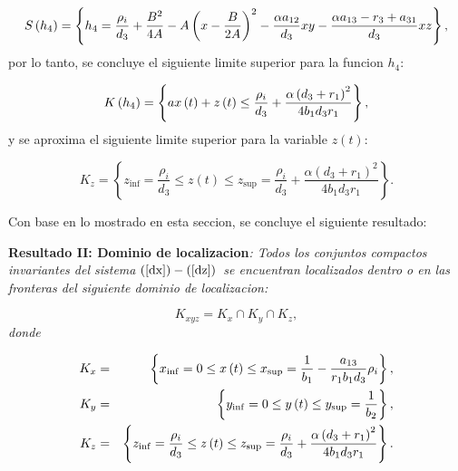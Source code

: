 \documentclass[letterpaper,11pt]{article}
\begin{document}
\begin{equation*}
S\left( h_{4}\right) =\left\{ h_{4}=\frac{\rho _{i}}{d_{3}}+\frac{B^{2}}{4A}%
-A\left( x-\frac{B}{2A}\right) ^{2}-\frac{\alpha a_{12}}{d_{3}}xy-\frac{%
\alpha a_{13}-r_{3}+a_{31}}{d_{3}}xz\right\} ,
\end{equation*}%
por lo tanto, se concluye el siguiente limite superior para la funcion $%
h_{4} $:

\begin{equation*}
K\left( h_{4}\right) =\left\{ ax\left( t\right) +z\left( t\right) \leq \frac{%
\rho _{i}}{d_{3}}+\frac{\alpha \left( d_{3}+r_{1}\right) ^{2}}{%
4b_{1}d_{3}r_{1}}\right\} ,
\end{equation*}%
y se aproxima el siguiente limite superior para la variable $z\left(
t\right) $:

\begin{equation*}
K_{z}=\left\{ z_{\inf }=\frac{\rho _{i}}{d_{3}}\leq z\left( t\right) \leq
z_{\sup }=\frac{\rho _{i}}{d_{3}}+\frac{\alpha \left( d_{3}+r_{1}\right) ^{2}%
}{4b_{1}d_{3}r_{1}}\right\} .
\end{equation*}

Con base en lo mostrado en esta seccion, se concluye el siguiente resultado:

\bigskip

\textbf{Resultado II: Dominio de localizacion}\textit{: Todos los conjuntos
compactos invariantes del sistema }$\left( \ref{dx}\right) -\left( \ref{dz}%
\right) $\textit{\ se encuentran localizados dentro o en las fronteras del
siguiente dominio de localizacion:}

\bigskip 
\begin{equation*}
K_{xyz}=K_{x}\cap K_{y}\cap K_{z},
\end{equation*}%
\textit{donde}

\bigskip 
\begin{eqnarray*}
K_{x} &=&\left\{ x_{\inf }=0\leq x\left( t\right) \leq x_{\sup }=\frac{1}{%
b_{1}}-\frac{a_{13}}{r_{1}b_{1}d_{3}}\rho _{i}\right\} , \\
K_{y} &=&\left\{ y_{\inf }=0\leq y\left( t\right) \leq y_{\sup }=\frac{1}{%
b_{2}}\right\} , \\
K_{z} &=&\left\{ z_{\inf }=\frac{\rho _{i}}{d_{3}}\leq z\left( t\right) \leq
z_{\sup }=\frac{\rho _{i}}{d_{3}}+\frac{\alpha \left( d_{3}+r_{1}\right) ^{2}%
}{4b_{1}d_{3}r_{1}}\right\} .
\end{eqnarray*}

\bigskip

\bigskip
\end{document}
